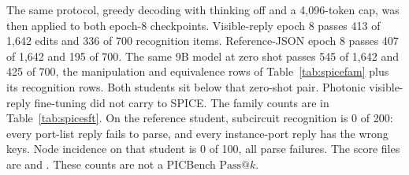 \documentclass[11pt]{article}
\makeatletter
\newcommand{\passk}[1]{\mathrm{Pass@}#1}
\makeatother
\begin{document}
The same protocol, greedy decoding with thinking off and a 4{,}096-token cap, was then applied to both epoch-8 checkpoints.
Visible-reply epoch 8 passes 413 of 1{,}642 edits and 336 of 700 recognition items.
Reference-JSON epoch 8 passes 407 of 1{,}642 and 195 of 700.
The same 9B model at zero shot passes 545 of 1{,}642 and 425 of 700, the manipulation and equivalence rows of Table~\ref{tab:spicefam} plus its recognition rows.
Both students sit below that zero-shot pair.
Photonic visible-reply fine-tuning did not carry to SPICE.
The family counts are in Table~\ref{tab:spicesft}.
On the reference student, subcircuit recognition is 0 of 200: every port-list reply fails to parse, and every instance-port reply has the wrong keys.
Node incidence on that student is 0 of 100, all parse failures.
The score files are  and .
These counts are not a PICBench $\passk{k}$.
\end{document}
